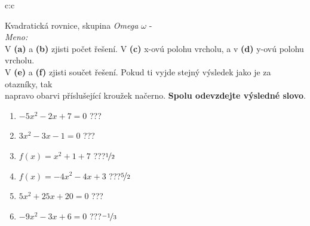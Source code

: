 \documentclass[10pt]{report}
\begin{document}
\clearpage
\thispagestyle{empty}
\begin{tabular}{c:c}
\begin{minipage}[c][99mm][t]{0.49\linewidth}
\begin{center}
\vspace{7mm}
{\huge Kvadratická rovnice, skupina \textit{Omega $\omega$} -}\\[4.5mm]
\textit{Meno:}\phantom{xxxxxxxxxxxxxxxxxxxxxxxxxxxxxxxxxxxxxxxxxxxxxxxxxxxxxxxxxxxxxxxxx}\\[3.5mm]
V \textbf{(a)} a \textbf{(b)} zjisti počet řešení. V \textbf{(c)} x-ovú polohu vrcholu, a v \textbf{(d)} y-ovú polohu vrcholu.\\V \textbf{(e)} a \textbf{(f)} zjisti součet řešení. Pokud ti vyjde stejný výsledek jako je za otazníky, tak\\napravo obarvi příslušející kroužek načerno. \textbf{Spolu odevzdejte výsledné slovo}.\\[3mm]
\begin{minipage}{0.77\linewidth}
\begin{center}
\begin{varwidth}{\textwidth}
\begin{enumerate}
\large
\item $-5x^2-2x+7=0$\quad \dotfill\; ???\;\dotfill {}
\item $3x^2-3x-1=0$\quad \dotfill\; ???\;\dotfill {}
\item $f(x)=x^2+1+7$\quad \dotfill\; ???\;\dotfill \quad $\nicefrac{1}{2}$
\item $f(x)=-4x^2-4x+3$\quad \dotfill\; ???\;\dotfill \quad $\nicefrac{5}{2}$
\item $5x^2+25x+20=0$\quad \dotfill\; ???\;\dotfill {}
\item $-9x^2-3x+6=0$\quad \dotfill\; ???\;\dotfill \quad $\nicefrac{-1}{3}$
\end{enumerate}
\end{varwidth}
\end{center}
\end{minipage}

\end{center}
\end{minipage}
\end{tabular}
\end{document}
